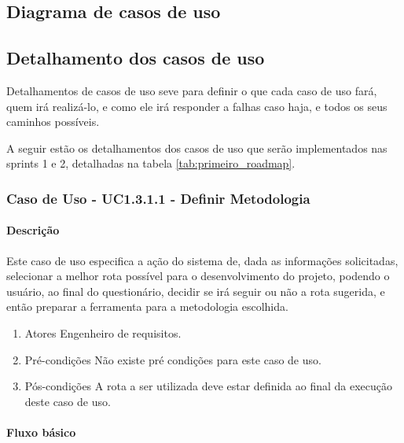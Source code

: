 \subsection{Diagrama de casos de uso}

\subsection{Detalhamento dos casos de uso}

Detalhamentos de casos de uso seve para definir o que cada caso de uso fará, quem irá realizá-lo, e como ele irá responder a falhas caso haja, e todos os seus caminhos possíveis.

A seguir estão os detalhamentos dos casos de uso que serão implementados nas sprints 1 e 2, detalhadas na tabela \ref{tab:primeiro_roadmap}.

\subsubsection{Caso de Uso - UC1.3.1.1 - Definir Metodologia}

\paragraph{Descrição}

Este caso de uso especifica a ação do sistema de, dada as informações solicitadas, selecionar a melhor rota possível para o desenvolvimento do projeto, podendo o usuário, ao final do questionário, decidir se irá seguir ou não a rota sugerida, e então preparar a ferramenta para a metodologia escolhida.

\begin{enumerate}
	\item Atores
		Engenheiro de requisitos. 
	\item Pré-condições
		Não existe pré condições para este caso de uso.
	\item Pós-condições
		A rota a ser utilizada deve estar definida ao final da execução deste caso de uso.
\end{enumerate}

\paragraph{Fluxo básico}

